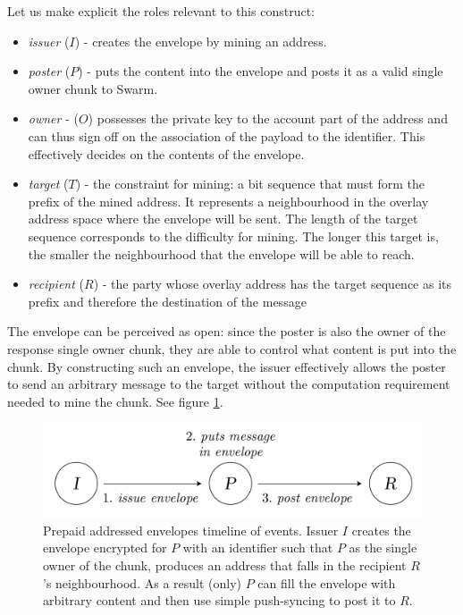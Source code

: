 Let us make explicit the roles relevant to this construct:

\begin{itemize}
\item \emph{issuer} ($I$) - creates the envelope by mining an address. 
\item \emph{poster} ($P$) - puts the content into the envelope and posts it as a valid single owner chunk to Swarm.
\item \emph{owner} - ($O$) possesses the private key to the account part of the address and can thus sign off on the association of the payload to the identifier. This effectively decides on the contents of the envelope.
\item \emph{target} ($T$) - the constraint for mining: a bit sequence that must form the prefix of the mined address. It represents a neighbourhood in the overlay address space where the envelope will be sent. The length of the target sequence corresponds to the difficulty for mining. The longer this target is, the smaller the neighbourhood that the envelope will be able to reach.
\item \emph{recipient} ($R$) - the party whose overlay address has the target sequence as its prefix and therefore the destination of the message
\end{itemize}

The envelope can be perceived as open: since the poster is also the owner of the response single owner chunk, they are able to control what content is put into the chunk. By constructing such an envelope, the issuer effectively allows the poster to send an arbitrary message to the target without the computation requirement needed to mine the chunk. See figure \ref{fig:addressed-envelope-events}. 


\begin{figure}[htbp]
   \centering
   \includegraphics[width=\textwidth]{fig/prepaid-addressed-envelopes-events.pdf}
   \caption[Prepaid addressed envelopes timeline of events \statusgreen]{Prepaid addressed envelopes timeline of events. Issuer $I$ creates the envelope encrypted for $P$ with an identifier such that $P$ as the single owner of the chunk, produces an address that falls in the recipient $R$'s neighbourhood. As a result (only) $P$ can fill the envelope with arbitrary content and then use simple push-syncing to post it to $R$.}
   \label{fig:addressed-envelope-events}
\end{figure}

